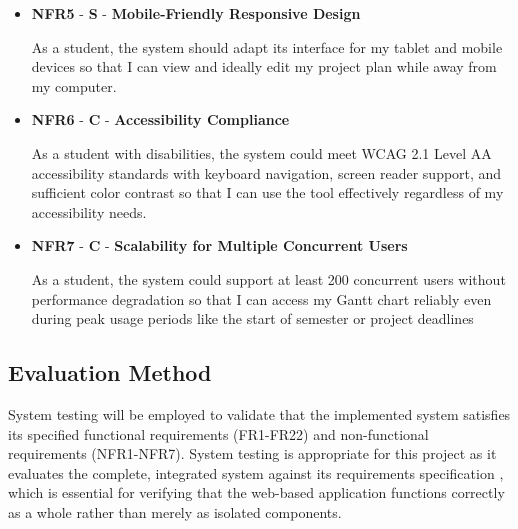 \documentclass[12pt,nonacm,acmlarge,titlepage,screen]{acmart}
\begin{document}
\begin{itemize}
    As a student, the system should provide a clear, intuitive interface that I can use effectively without extensive training so that I can focus on planning my dissertation rather than learning how to use the tool.
    \item	\textbf{	NFR5	}	-	\textbf{	S	}	-	\textbf{	Mobile-Friendly Responsive Design	}		 
    
    As a student, the system should adapt its interface for my tablet and mobile devices so that I can view and ideally edit my project plan while away from my computer.
    \item	\textbf{	NFR6	}	-	\textbf{	C	}	-	\textbf{	Accessibility Compliance	}		
    
    As a student with disabilities, the system could meet WCAG 2.1 Level AA accessibility standards with keyboard navigation, screen reader support, and sufficient color contrast so that I can use the tool effectively regardless of my accessibility needs.
    \item	\textbf{	NFR7	}	-	\textbf{	C	}	-	\textbf{	Scalability for Multiple Concurrent Users	}		
    
    As a student, the system could support at least 200 concurrent users without performance degradation so that I can access my Gantt chart reliably even during peak usage periods like the start of semester or project deadlines
\end{itemize}






\subsection{Evaluation Method} \label{cha:eval_meth}

System testing will be employed to validate that the implemented system satisfies its specified functional requirements (FR1-FR22) and non-functional requirements (NFR1-NFR7). System testing is appropriate for this project as it evaluates the complete, integrated system against its requirements specification \cite{geeksforgeeks_unit_vs_system_testing}, which is essential for verifying that the web-based application functions correctly as a whole rather than merely as isolated components.
\end{document}
